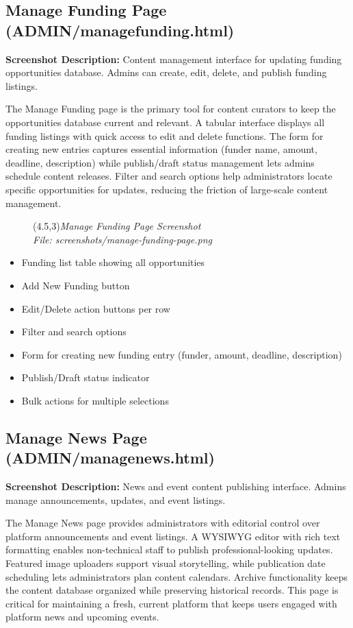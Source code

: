 \documentclass[a4paper,12pt]{article}
\begin{document}
\subsection{Manage Funding Page (ADMIN/managefunding.html)}
\textbf{Screenshot Description:} Content management interface for updating funding opportunities database. Admins can create, edit, delete, and publish funding listings.

The Manage Funding page is the primary tool for content curators to keep the opportunities database current and relevant. A tabular interface displays all funding listings with quick access to edit and delete functions. The form for creating new entries captures essential information (funder name, amount, deadline, description) while publish/draft status management lets admins schedule content releases. Filter and search options help administrators locate specific opportunities for updates, reducing the friction of large-scale content management.

\begin{figure}[h]
    \centering
    \framebox(4.5,3){\textit{Manage Funding Page Screenshot}}\\
    \small\textit{File: screenshots/manage-funding-page.png}
\end{figure}

\begin{itemize}
    \item Funding list table showing all opportunities
    \item Add New Funding button
    \item Edit/Delete action buttons per row
    \item Filter and search options
    \item Form for creating new funding entry (funder, amount, deadline, description)
    \item Publish/Draft status indicator
    \item Bulk actions for multiple selections
\end{itemize}

\subsection{Manage News Page (ADMIN/managenews.html)}
\textbf{Screenshot Description:} News and event content publishing interface. Admins manage announcements, updates, and event listings.

The Manage News page provides administrators with editorial control over platform announcements and event listings. A WYSIWYG editor with rich text formatting enables non-technical staff to publish professional-looking updates. Featured image uploaders support visual storytelling, while publication date scheduling lets administrators plan content calendars. Archive functionality keeps the content database organized while preserving historical records. This page is critical for maintaining a fresh, current platform that keeps users engaged with platform news and upcoming events.
\end{document}
